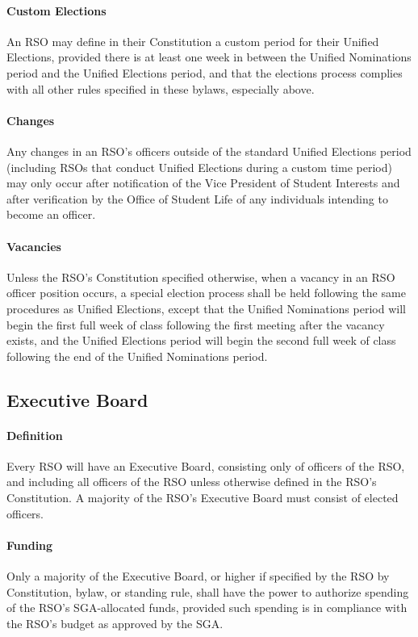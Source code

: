 \documentclass[12pt]{scrreprt}
\begin{document}
\paragraph{Custom Elections}
An RSO may define in their Constitution a custom period for their
Unified Elections, provided there is at least one week in between the
Unified Nominations period and the Unified Elections period, and that
the elections process complies with all other rules specified in these
bylaws, especially above.

\paragraph{Changes}
Any changes in an RSO’s officers outside of the standard Unified
Elections period (including RSOs that conduct Unified Elections during
a custom time period) may only occur after notification of the Vice President of Student Interests and after verification by the Office of Student Life of any individuals intending to become an officer.

\paragraph{Vacancies}
Unless the RSO’s Constitution specified otherwise, when a vacancy in
an RSO officer position occurs, a special election process shall be
held following the same procedures as Unified Elections, except that
the Unified Nominations period will begin the first full week of class
following the first meeting after the vacancy exists, and the Unified
Elections period will begin the second full week of class following
the end of the Unified Nominations period.

\subsection{Executive Board}

\paragraph{Definition}
Every RSO will have an Executive Board, consisting only of officers of
the RSO, and including all officers of the RSO unless otherwise
defined in the RSO’s Constitution. A majority of the RSO’s Executive
Board must consist of elected officers.

\paragraph{Funding}
Only a majority of the Executive Board, or higher if specified by the
RSO by Constitution, bylaw, or standing rule, shall have the power to
authorize spending of the RSO’s SGA-allocated funds, provided such
spending is in compliance with the RSO’s budget as approved by the
SGA.
\end{document}
